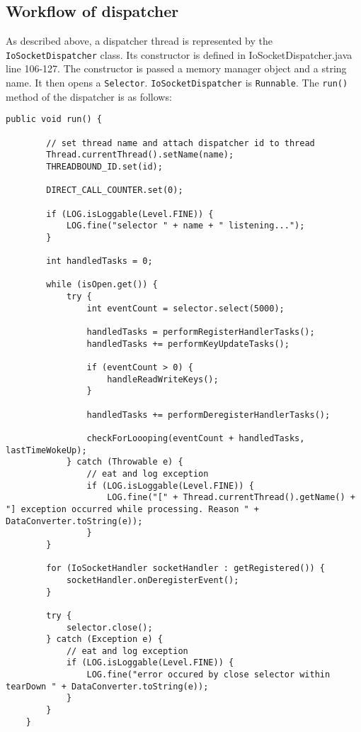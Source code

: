 \documentclass[letterpaper,12pt]{article}
\begin{document}
\subsection{Workflow of dispatcher}

As described above, a dispatcher thread is represented by the \texttt{IoSocketDispatcher} class. Its constructor is defined in IoSocketDispatcher.java line 106-127. The constructor is passed a memory manager object and a string name. It then opens a \texttt{Selector}. \texttt{IoSocketDispatcher} is \texttt{Runnable}. The \texttt{run()} method of the dispatcher is as follows:

\begin{lstlisting}[label=dispatcherLoop,caption=Main loop of dispatcher]
    public void run() {
        
        // set thread name and attach dispatcher id to thread
        Thread.currentThread().setName(name);
        THREADBOUND_ID.set(id);

        DIRECT_CALL_COUNTER.set(0);

        if (LOG.isLoggable(Level.FINE)) {
            LOG.fine("selector " + name + " listening...");
        }

        int handledTasks = 0;

        while (isOpen.get()) {
            try {
                int eventCount = selector.select(5000);

                handledTasks = performRegisterHandlerTasks();
                handledTasks += performKeyUpdateTasks();

                if (eventCount > 0) {
                    handleReadWriteKeys();
                }

                handledTasks += performDeregisterHandlerTasks();

                checkForLoooping(eventCount + handledTasks, lastTimeWokeUp);
            } catch (Throwable e) {
                // eat and log exception
                if (LOG.isLoggable(Level.FINE)) {
                    LOG.fine("[" + Thread.currentThread().getName() + "] exception occurred while processing. Reason " + DataConverter.toString(e));
                }
        }
        
        for (IoSocketHandler socketHandler : getRegistered()) {
            socketHandler.onDeregisterEvent();
        }

        try {
            selector.close();
        } catch (Exception e) {
            // eat and log exception
            if (LOG.isLoggable(Level.FINE)) {
                LOG.fine("error occured by close selector within tearDown " + DataConverter.toString(e));
            }
        }
    }
\end{lstlisting}
\end{document}
